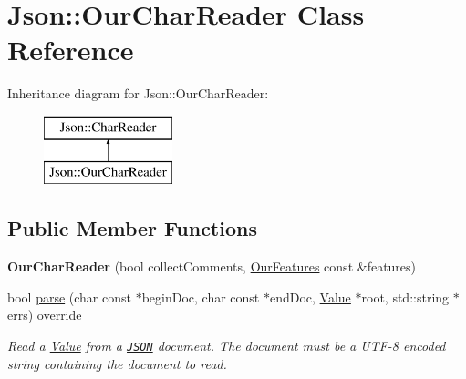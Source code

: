 \hypertarget{class_json_1_1_our_char_reader}{\section{Json\-:\-:Our\-Char\-Reader Class Reference}
\label{class_json_1_1_our_char_reader}
}
Inheritance diagram for Json\-:\-:Our\-Char\-Reader\-:\begin{figure}[H]
\begin{center}
\leavevmode
\includegraphics[height=2.000000cm]{class_json_1_1_our_char_reader}
\end{center}
\end{figure}
\subsection*{Public Member Functions}
\begin{DoxyCompactItemize}
\item 
\hypertarget{class_json_1_1_our_char_reader_a5015506620e7ba7bab417756fa1ca9fe}{{\bfseries Our\-Char\-Reader} (bool collect\-Comments, \hyperlink{class_json_1_1_our_features}{Our\-Features} const \&features)}\label{class_json_1_1_our_char_reader_a5015506620e7ba7bab417756fa1ca9fe}

\item 
bool \hyperlink{class_json_1_1_our_char_reader_a52a1fb5fee88d9b63dd462f63b1c9570}{parse} (char const $\ast$begin\-Doc, char const $\ast$end\-Doc, \hyperlink{class_json_1_1_value}{Value} $\ast$root, std\-::string $\ast$errs) override
\begin{DoxyCompactList}\small\item\em Read a \hyperlink{class_json_1_1_value}{Value} from a \href{http://www.json.org}{\tt J\-S\-O\-N} document. The document must be a U\-T\-F-\/8 encoded string containing the document to read. \end{DoxyCompactList}\end{DoxyCompactItemize}



